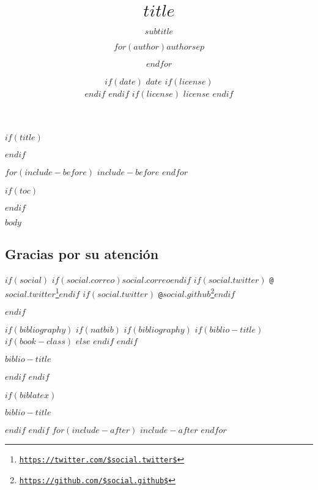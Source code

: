 \documentclass[$if(fontsize)$$fontsize$,$endif$$if(lang)$$babel-lang$,$endif$$if(handout)$handout,$endif$$if(colorlinks)$dvipsnames,$endif$$if(beamer)$ignorenonframetext,$endif$$for(classoption)$$classoption$$sep$,$endfor$]{$documentclass$}
\title[$shorttitle$]{$title$}
\subtitle{$subtitle$}
\author[
$if(short-author)$
$for(short-author)$$short-author$$sep$ \and $endfor$
$else$
$for(author)$$author$$sep$ \and $endfor$
$endif$
]{$for(author)$$author$$sep$ \and $endfor$}
\institute[
$if(short-institute)$
$for(short-institute)$$short-institute$$sep$ \and $endfor$
$endif$
]{
	$if(department)$
	$for(department)$$department$$sep$ \and $endfor$ \\
	$endif$
	$for(institute)$$institute$$sep$ \and $endfor$
	$if(email)$
	\\ $for(email)$ \href{mailto:$email$}{\nolinkurl{$email$}}$sep$ \and $endfor$
	$endif$
}
\date[
$if(short-date)$
$short-date$
$else$
$date$
$endif$]{
	$if(date)$
	$date$
	$if(license)$
	\\ \vspace{5mm}
	$endif$
	$endif$
	$if(license)$
	{\scriptsize $license$}
	$endif$
}
\newif\ifbibliography
\renewcommand{\href}[2]{#2\footnote{\url{#1}}}
\begin{document}
	$if(title)$
	\begin{frame}[plain]
		\titlepage
	\end{frame}
	$endif$

	$for(include-before)$
	$include-before$
	$endfor$

	$if(toc)$
	\begin{frame}
		\tableofcontents[hideallsubsections]
	\end{frame}
	$endif$

	$body$


	\begin{frame}
		\section{Gracias por su atención}
		\centering

		$if(social)$
		$if(social.correo)$\faEnvelopeO \texttt{$social.correo$}$endif$	$if(social.twitter)$\hspace{.3cm} \faTwitter \texttt{\href{https://twitter.com/$social.twitter$}{@$social.twitter$}}$endif$ $if(social.twitter)$\hspace{.3cm} \faGithub \texttt{\href{https://github.com/$social.github$}{@$social.github$}}$endif$

		$endif$
	\end{frame}


	$if(bibliography)$
	$if(natbib)$
	$if(bibliography)$
	$if(biblio-title)$
	$if(book-class)$
	\renewcommand\bibname{$biblio-title$}
	$else$
	\renewcommand\refname{$biblio-title$}
	$endif$
	$endif$
	\begin{frame}[allowframebreaks]{$biblio-title$}
		\bibliographytrue
		
	\end{frame}
	$endif$
	$endif$

	$if(biblatex)$
	\begin{frame}[allowframebreaks]{$biblio-title$}
		\bibliographytrue
		\printbibliography[heading=none]
	\end{frame}
	$endif$
	$endif$
	$for(include-after)$
	$include-after$
	$endfor$
\end{document}
